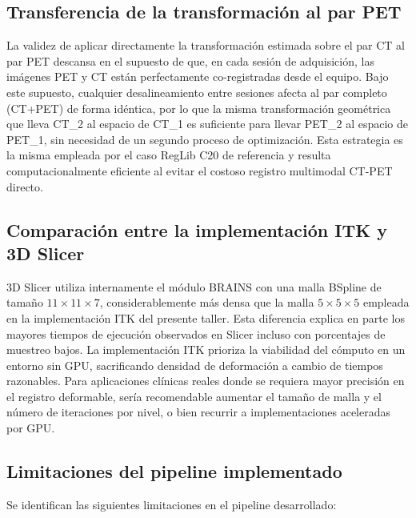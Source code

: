 \documentclass[12pt, letterpaper]{article}
\begin{document}
\subsection{Transferencia de la transformación al par PET}

La validez de aplicar directamente la transformación estimada sobre el par CT
al par PET descansa en el supuesto de que, en cada sesión de adquisición, las
imágenes PET y CT están perfectamente co-registradas desde el equipo. Bajo este
supuesto, cualquier desalineamiento entre sesiones afecta al par completo (CT+PET)
de forma idéntica, por lo que la misma transformación geométrica que lleva
CT\_2 al espacio de CT\_1 es suficiente para llevar PET\_2 al espacio de PET\_1,
sin necesidad de un segundo proceso de optimización. Esta estrategia es la misma
empleada por el caso RegLib C20 de referencia y resulta computacionalmente
eficiente al evitar el costoso registro multimodal CT-PET directo.

\subsection{Comparación entre la implementación ITK y 3D Slicer}

3D Slicer utiliza internamente el módulo BRAINS con una malla BSpline de tamaño
$11\times11\times7$, considerablemente más densa que la malla $5\times5\times5$ empleada en la
implementación ITK del presente taller. Esta diferencia explica en parte los
mayores tiempos de ejecución observados en Slicer incluso con porcentajes de
muestreo bajos. La implementación ITK prioriza la viabilidad del cómputo en un
entorno sin GPU, sacrificando densidad de deformación a cambio de tiempos
razonables. Para aplicaciones clínicas reales donde se requiera mayor precisión
en el registro deformable, sería recomendable aumentar el tamaño de malla y
el número de iteraciones por nivel, o bien recurrir a implementaciones aceleradas
por GPU.

\subsection{Limitaciones del pipeline implementado}

Se identifican las siguientes limitaciones en el pipeline desarrollado:
\end{document}
